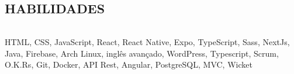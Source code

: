 \begin{framed}
    \section{HABILIDADES}
    \begin{tabular}{r|p{5cm}}
    \end{tabular}
    HTML, CSS, JavaScript, React, React Native, Expo, TypeScript, Sass,  NextJs, Java, Firebase, Arch Linux, inglês avançado, WordPress, Typescript, Scrum, O.K.Rs, Git, Docker, API Rest, Angular, PostgreSQL, MVC, Wicket
  \end{framed}
